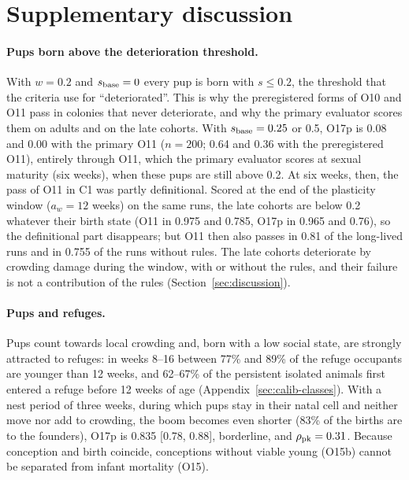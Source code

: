 \section{Supplementary discussion}
\label{app:discussion}

\paragraph{Pups born above the deterioration threshold.}
With $w=0.2$ and $s_{\rm base}=0$ every pup is born with $s\le0.2$, the threshold that the criteria use for
``deteriorated''. This is why the preregistered forms of O10 and O11 pass in colonies that never deteriorate, and why
the primary evaluator scores them on adults and on the late cohorts. With $s_{\rm base}=0.25$ or 0.5, O17p is 0.08 and 0.00 with the
primary O11 ($n=200$; 0.64 and 0.36 with the preregistered O11), entirely through O11, which the primary evaluator
scores at sexual maturity (six weeks), when these pups are still above 0.2. At six weeks, then, the pass of O11 in
\textsf{C1} was partly definitional. Scored at the end of the plasticity window ($a_w=12$ weeks) on the same runs,
the late cohorts are below 0.2 whatever their birth state (O11 in 0.975 and 0.785, O17p in 0.965 and 0.76), so the
definitional part disappears; but O11 then also passes in 0.81 of the long-lived runs and in 0.755 of the runs
without rules. The late cohorts deteriorate by crowding damage during the window, with or without the rules, and
their failure is not a contribution of the rules (Section~\ref{sec:discussion}).

\paragraph{Pups and refuges.}
Pups count towards local crowding and, born with a low social state, are strongly attracted to refuges: in weeks
8--16 between 77\% and 89\% of the refuge occupants are younger than 12 weeks, and 62--67\% of the persistent
isolated animals first entered a refuge before 12 weeks of age (Appendix~\ref{sec:calib-classes}). With a nest period
of three weeks, during which pups stay in their natal cell and neither move nor add to crowding, the boom becomes even
shorter (83\% of the births are to the founders), O17p is 0.835 [0.78, 0.88], borderline, and
$\rho_{\rm pk}=0.31$. Because conception and birth
coincide, conceptions without viable young (O15b) cannot be separated from infant mortality (O15).

